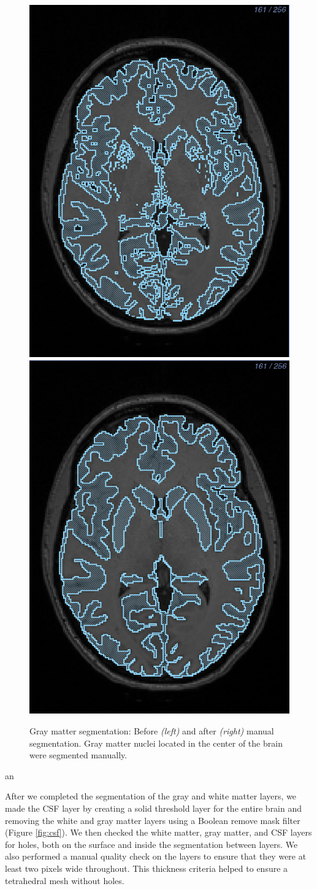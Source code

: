 \begin{figure}[H]
\begin{center}
\includegraphics[width=.49\textwidth]{Figures/greymatter_before_nuclei}
\includegraphics[width=.49\textwidth]{Figures/greymatter_added_nuclei}
\caption{Gray matter segmentation: Before \textit{(left)} and after \textit{(right)} manual segmentation. Gray matter nuclei located in the center of the brain were segmented manually.}
\label{fig:gm}
\end{center}
\end{figure}an

After we completed the segmentation of the gray and white matter layers, we made the CSF layer by creating a solid threshold layer for the entire brain and removing the white and gray matter layers using a Boolean remove mask filter (Figure \ref{fig:csf}). We then checked the white matter, gray matter, and CSF layers for holes, both on the surface and inside the segmentation between layers. We also performed a manual quality check on the layers to ensure that they were at least two pixels wide throughout. This thickness criteria helped to ensure a tetrahedral mesh without holes.

